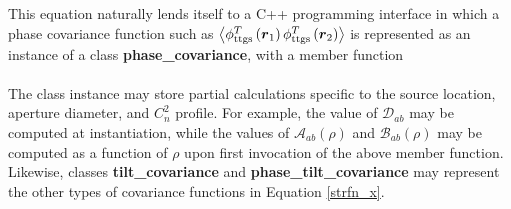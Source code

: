 This equation naturally lends itself to a C++ programming interface in
which a phase covariance function such as $\left\langle\phi^{T}_{\rm
  ttgs}\left(\boldsymbol{r}_{1}\right) \phi^{T}_{\rm
  ttgs}\left(\boldsymbol{r}_{2}\right)\right\rangle$ is represented as
an instance of a class {\bf phase\_covariance}, with a member function
\\ 
\\
The class instance may store partial calculations specific to the
source location, aperture diameter, and $C_{n}^{2}$ profile.  For
example, the value of $\mathcal{D}_{ab}$ may be computed at
instantiation, while the values of $\mathcal{A}_{ab}\left(\rho\right)$
and $\mathcal{B}_{ab}\left(\rho\right)$ may be computed as a function
of $\rho$ upon first invocation of the above member function.
Likewise, classes {\bf tilt\_covariance} and {\bf phase\_tilt\_covariance}
may represent the other types of covariance functions in Equation
\ref{strfn_x}.  
















